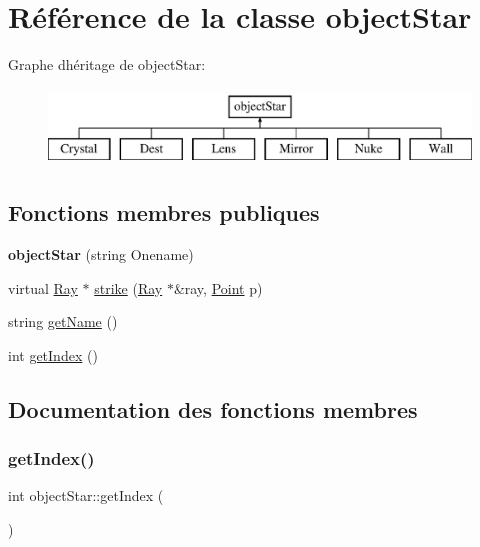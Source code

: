 \hypertarget{classobject_star}{}\section{Référence de la classe object\+Star}
\label{classobject_star}
Graphe d\textquotesingle{}héritage de object\+Star\+:\begin{figure}[H]
\begin{center}
\leavevmode
\includegraphics[height=2.000000cm]{classobject_star}
\end{center}
\end{figure}
\subsection*{Fonctions membres publiques}
\begin{DoxyCompactItemize}
\item 
\mbox{\label{classobject_star_a20d573447ba3a95e5ae2b90cf3187a21}} 
{\bfseries object\+Star} (string Onename)
\item 
virtual \mbox{\hyperlink{class_ray}{Ray}} $\ast$ \mbox{\hyperlink{classobject_star_a5155713af07f8397057706a1eeb843ed}{strike}} (\mbox{\hyperlink{class_ray}{Ray}} $\ast$\&ray, \mbox{\hyperlink{class_point}{Point}} p)
\item 
string \mbox{\hyperlink{classobject_star_a39fec832fe18f2e43ea36f7e842a6a82}{get\+Name}} ()
\item 
int \mbox{\hyperlink{classobject_star_acc2922cf2379abf69ad3e8533d154883}{get\+Index}} ()
\end{DoxyCompactItemize}


\subsection{Documentation des fonctions membres}
\mbox{\label{classobject_star_acc2922cf2379abf69ad3e8533d154883}} 
\subsubsection{\texorpdfstring{getIndex()}{getIndex()}}
{\footnotesize\ttfamily int object\+Star\+::get\+Index (\begin{DoxyParamCaption}{ }\end{DoxyParamCaption})}

